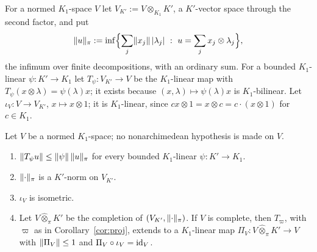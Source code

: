 For a normed $K_1$\nobreakdash-space $V$ let $V_{K'}:=V\otimes_{K_1}K'$, a $K'$\nobreakdash-vector space through the second factor, and put
\[
\norm u_\pi:=\inf\Bigl\{\sum_j\norm{x_j}\,\abs{\lambda_j}\ :\ u=\sum_jx_j\otimes\lambda_j\Bigr\},
\]
the infimum over finite decompositions, with an ordinary sum. For a bounded $K_1$\nobreakdash-linear $\psi\colon K'\to K_1$ let
$T_\psi\colon V_{K'}\to V$ be the $K_1$\nobreakdash-linear map with $T_\psi(x\otimes\lambda)=\psi(\lambda)x$; it exists because
$(x,\lambda)\mapsto\psi(\lambda)x$ is $K_1$\nobreakdash-bilinear. Let $\iota_V\colon V\to V_{K'}$, $x\mapsto x\otimes1$; it is
$K_1$\nobreakdash-linear, since $cx\otimes1=x\otimes c=c\cdot(x\otimes1)$ for $c\in K_1$.

\begin{lemma}\label{lem:bc}
Let $V$ be a normed $K_1$\nobreakdash-space; no nonarchimedean hypothesis is made on $V$.
\begin{enumerate}
\item $\lVert T_\psi u\rVert\le\lVert \psi\rVert\,\lVert u\rVert_\pi$ for every bounded $K_1$\nobreakdash-linear $\psi\colon K'\to K_1$.
\item $\lVert \cdot\rVert_\pi$ is a $K'$\nobreakdash-norm on $V_{K'}$.
\item $\iota_V$ is isometric.
\item Let $V\widehat\otimes_\pi K'$ be the completion of $(V_{K'},\lVert \cdot\rVert_\pi)$. If $V$ is complete, then $T_\varpi$, with
$\varpi$ as in Corollary~\ref{cor:proj}, extends to a $K_1$\nobreakdash-linear map $\Pi_V\colon V\widehat\otimes_\pi K'\to V$ with
$\lVert \Pi_V\rVert\le1$ and $\Pi_V\circ\iota_V=\mathrm{id}_V$.
\end{enumerate}
\end{lemma}

